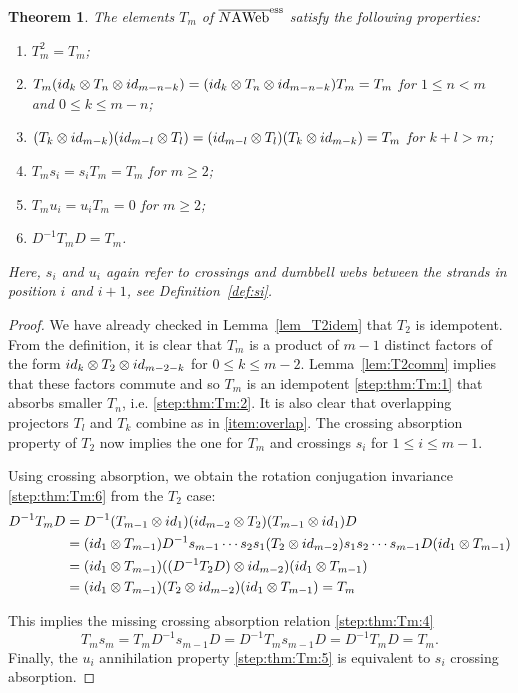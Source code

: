 \documentclass[11pt]{article}
\newtheorem{theo}{Theorem}[section]
\theoremstyle{definition}
\numberwithin{equation}{section}
\newcommand{\id}{{\rm id}}
\newcommand{\cat}[1]{\ensuremath{\mbox{\bfseries {\upshape {#1}}}}}
\newcommand{\wrap}{D}
\newcommand{\wrapi}{D^{-1}}
\newcommand{\AWeb}[1][]{#1\cat{A}\cat{Web}}
\newcommand{\essbAWeb}[1][]{\overline{#1\AWeb}^{\mathrm{ess}}}
\begin{document}
\begin{theo} \label{thm:Tm}
  The elements $T_m$ of $\essbAWeb[N]$ satisfy the following properties: 
  \begin{enumerate}
  \item $T_m^2=T_m$; \label{step:thm:Tm:1}
  \item $T_m (\id_{k}\otimes T_n\otimes \id_{m-n-k}) =(\id_{k}\otimes T_n\otimes \id_{m-n-k}) T_m = T_m$ for $1\leq n< m$ and $0\leq k\leq m-n$; \label{step:thm:Tm:2}
  \item $(T_k\otimes \id_{m-k})(\id_{m-l}\otimes T_l)= (\id_{m-l}\otimes T_l) (T_k\otimes \id_{m-k})  = T_{m}$ for $k+l> m$; \label{item:overlap} 
\item $T_m s_i= s_i T_m=T_m$ for $m\geq 2$; \label{step:thm:Tm:4}
\item $T_m u_i= u_i T_m=0$ for $m\geq 2$; \label{step:thm:Tm:5}
 \item $\wrapi T_m \wrap=T_m$. \label{step:thm:Tm:6}
  \end{enumerate}
Here, $s_i$ and $u_i$ again refer to crossings and dumbbell webs between the strands in position $i$ and $i+1$, see Definition~\ref{def:si}.
\end{theo}
\begin{proof} We have already checked in Lemma~\ref{lem_T2idem} that $T_2$ is idempotent. From the definition, it is clear that $T_m$ is a product of $m-1$ distinct factors of the form $\id_{k}\otimes T_2 \otimes \id_{m-2-k}$ for $0\leq k\leq m-2$. Lemma~\ref{lem:T2comm} implies that these factors commute and so $T_m$ is an idempotent \eqref{step:thm:Tm:1} that absorbs smaller $T_n$, i.e. \eqref{step:thm:Tm:2}. It is also clear that overlapping projectors $T_l$ and $T_k$ combine as in \eqref{item:overlap}. The crossing absorption property of $T_2$ now implies the one for $T_m$ and crossings $s_i$ for $1\leq i \leq m-1$. 

Using crossing absorption, we obtain the rotation conjugation invariance \eqref{step:thm:Tm:6} from the $T_2$  case:
\begin{align*}
\wrapi T_m \wrap &=\wrapi (T_{m-1}\otimes \id_1)(\id_{m-2}\otimes T_2)(T_{m-1}\otimes \id_1) \wrap \\
&= (\id_1 \otimes T_{m-1})\wrapi s_{m-1}\cdots s_{2}s_{1}(T_2\otimes \id_{m-2})s_{1}s_{2}\cdots s_{m-1} \wrap (\id_1 \otimes T_{m-1})
\\
&= (\id_1 \otimes T_{m-1})((\wrapi T_2 \wrap)\otimes \id_{m-2}) (\id_1 \otimes T_{m-1}) 
\\&= (\id_1 \otimes T_{m-1})( T_2 \otimes \id_{m-2}) (\id_1 \otimes T_{m-1}) = T_{m} 
\end{align*}

This implies the missing crossing absorption relation \eqref{step:thm:Tm:4}
\[T_m s_m= T_m \wrapi s_{m-1} \wrap = \wrapi T_m  s_{m-1} \wrap = \wrapi T_m  \wrap =T_m .\] 
Finally, the $u_i$ annihilation property \eqref{step:thm:Tm:5} is equivalent to $s_i$ crossing absorption.
\end{proof}
\end{document}
